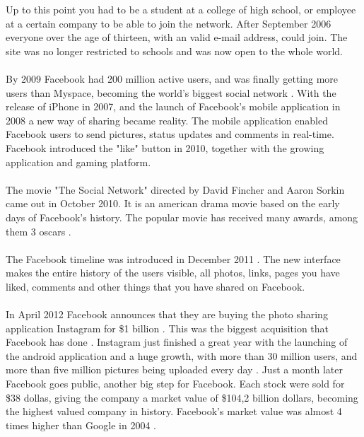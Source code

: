 Up to this point you had to be a student at a college of high school, or employee at a certain company to be able to join the network. After September 2006 everyone over the age of thirteen, with an valid e-mail address, could join. The site was no longer restricted to schools and was now open to the whole world. 

\paragraph{}
By 2009 Facebook had 200 million active users, and was finally getting more users than Myspace, becoming the world's biggest social network \cite{FacebookStoryInceptionToIsp}. With the release of iPhone in 2007, and the launch of Facebook's mobile application in 2008 a new way of sharing became reality. The mobile application enabled Facebook users to send pictures, status updates and comments in real-time. Facebook introduced the "like" button in 2010, together with the growing application and gaming platform. 

\paragraph{}
The movie "The Social Network" directed by David Fincher and Aaron Sorkin came out in October 2010. It is an american drama movie based on the early days of Facebook's history. The popular movie has received many awards, among them 3 oscars \cite{TheSocialNetwork}. 

\paragraph{}
The Facebook timeline was introduced in December 2011 \cite{EvolutionOfFacebook}. The new interface makes the entire history of the users visible, all photos, links, pages you have liked, comments and other things that you have shared on Facebook. 

\paragraph{}
In April 2012 Facebook announces that they are buying the photo sharing application Instagram for \$1 billion . This was the biggest acquisition that Facebook has done \cite{FacebookInstragram}. Instagram just finished a great year with the launching of the android application and a huge growth, with more than 30 million users, and more than five million pictures being uploaded every day \cite{BBCFacebookGrowth}. 
Just a month later Facebook goes public, another big step for Facebook. Each stock were sold for \$38 dollas, giving the company a market value of \$104,2 billion dollars, becoming the highest valued company in history. Facebook's market value was almost 4 times higher than Google in 2004 \cite{EvolutionOfFacebook}. 
  
